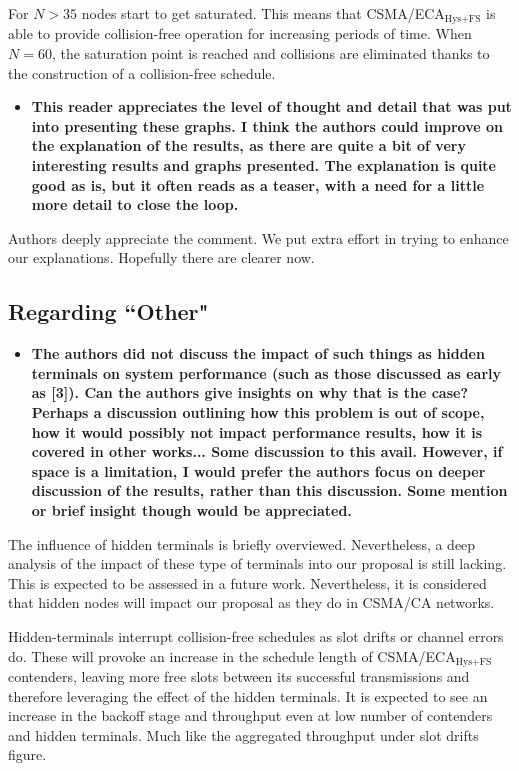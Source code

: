 \documentclass[]{article}
\begin{document}
		For $N>35$ nodes start to get saturated. This means that CSMA/ECA$_{\text{Hys+FS}}$ is able to provide collision-free operation for increasing periods of time. When $N=60$, the saturation point is reached and collisions are eliminated thanks to the construction of a collision-free schedule.
		
		\begin{itemize}
			\item {\bfseries This reader appreciates the level of thought and detail that was put into presenting these graphs. I think the authors could improve on the explanation of the results, as there are quite a bit of very interesting results and graphs presented. The explanation is quite good as is, but it often reads as a teaser, with a need for a little more detail to close the loop.}
		\end{itemize}
		
		Authors deeply appreciate the comment. We put extra effort in trying to enhance our explanations. Hopefully there are clearer now.
		
	\subsection{Regarding ``Other"}
		\begin{itemize}
			\item {\bf The authors did not discuss the impact of such things as hidden terminals on system performance (such as those discussed as early as [3]). Can the authors give insights on why that is the case? Perhaps a discussion outlining how this problem is out of scope, how it would possibly not impact performance results, how it is covered in other works... Some discussion to this avail. However, if space is a limitation, I would prefer the authors focus on deeper discussion of the results, rather than this discussion. Some mention or brief insight though would be appreciated.}
		\end{itemize}
	
		The influence of hidden terminals is briefly overviewed. Nevertheless, a deep analysis of the impact of these type of terminals into our proposal is still lacking. This is expected to be assessed in a future work. Nevertheless, it is considered that hidden nodes will impact our proposal as they do in CSMA/CA networks.
		
		Hidden-terminals interrupt collision-free schedules as slot drifts or channel errors do. These will provoke an increase in the schedule length of CSMA/ECA$_{\text{Hys+FS}}$ contenders, leaving more free slots between its successful transmissions and therefore leveraging the effect of the hidden terminals. It is expected to see an increase in the backoff stage and throughput even at low number of contenders and hidden terminals. Much like the aggregated throughput under slot drifts figure.
		
\end{document}
